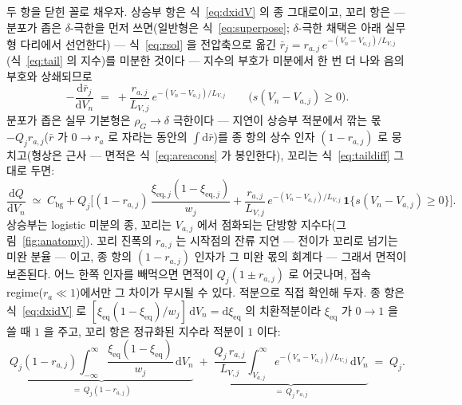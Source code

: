 \documentclass[11pt,a4paper]{article}
\newcommand{\dd}{\mathrm{d}}
\newcommand{\eq}{\mathrm{eq}}
\newcommand{\bg}{\mathrm{bg}}
\begin{document}
두 항을 닫힌 꼴로 채우자. 상승부 항은 식~\eqref{eq:dxidV} 의 종 그대로이고, 꼬리 항은
— 분포가 좁은 $\delta$-극한을 먼저 쓰면(일반형은 식~\eqref{eq:superpose}; $\delta$-극한 채택은
아래 실무형 다리에서 선언한다) —
식~\eqref{eq:rsol} 을 전압축으로 옮긴 $\bar r_j=r_{a,j}\,e^{-(V_n-V_{a,j})/L_{V,j}}$
(식~\eqref{eq:tail} 의 지수)를 미분한 것이다 — 지수의 부호가 미분에서 한 번 더 나와 음의 부호와
상쇄되므로
\begin{equation}
-\frac{\dd\bar r_j}{\dd V_n}\;=\;+\frac{r_{a,j}}{L_{V,j}}\,e^{-(V_n-V_{a,j})/L_{V,j}}
\qquad\big(s(V_n-V_{a,j})\ge0\big).
\label{eq:taildiff}
\end{equation}
분포가 좁은 실무 기본형은 $\rho_G\to\delta$ 극한이다 — 지연이 상승부 적분에서 깎는 몫
$-Q_jr_{a,j}$($\bar r$ 가 $0\to r_a$ 로 자라는 동안의 $\int\dd\bar r$)를 종 항의 상수 인자
$(1-r_{a,j})$ 로 뭉치고(형상은 근사 — 면적은 식~\eqref{eq:areacons} 가 봉인한다), 꼬리는
식~\eqref{eq:taildiff} 그대로 두면:
\begin{equation}
\frac{\dd Q}{\dd V_n}\;\simeq\;C_\bg+Q_j\bigg[
(1-r_{a,j})\,\frac{\xi_{\eq,j}(1-\xi_{\eq,j})}{w_j}
+\frac{r_{a,j}}{L_{V,j}}\,e^{-(V_n-V_{a,j})/L_{V,j}}\,\mathbf 1\{s(V_n-V_{a,j})\ge0\}\bigg].
\label{eq:simplefit}
\end{equation}
상승부는 logistic 미분의 종, 꼬리는 $V_{a,j}$ 에서 점화되는 단방향 지수다(그림~\ref{fig:anatomy}). 꼬리
진폭의 $r_{a,j}$ 는 시작점의 잔류 지연 — 전이가 꼬리로 넘기는 미완 분율 — 이고, 종 항의
$(1-r_{a,j})$ 인자가 그 미완 몫의 회계다 — 그래서 면적이 보존된다. 어느 한쪽 인자를 빼먹으면 면적이 $Q_j(1\pm r_{a,j})$ 로 어긋나며,
접속 regime($r_a\ll1$)에서만 그 차이가 무시될 수 있다. 적분으로 직접 확인해 두자. 종 항은
식~\eqref{eq:dxidV} 로 $[\xi_{\eq}(1-\xi_{\eq})/w_j]\,\dd V_n=\dd\xi_{\eq}$ 의 치환적분이라
$\xi_{\eq}$ 가 $0\to1$ 을 쓸 때 $1$ 을 주고, 꼬리 항은 정규화된 지수라 적분이 $1$ 이다:
\begin{equation}
\underbrace{Q_j(1-r_{a,j})\!\int_{-\infty}^{\infty}\!
\frac{\xi_{\eq}(1-\xi_{\eq})}{w_j}\,\dd V_n}_{=\,Q_j(1-r_{a,j})}
\;+\;
\underbrace{\frac{Q_j\,r_{a,j}}{L_{V,j}}\!\int_{V_{a,j}}^{\infty}\!
e^{-(V_n-V_{a,j})/L_{V,j}}\,\dd V_n}_{=\,Q_j\,r_{a,j}}
\;=\;Q_j.
\label{eq:areacons}
\end{equation}
\end{document}
